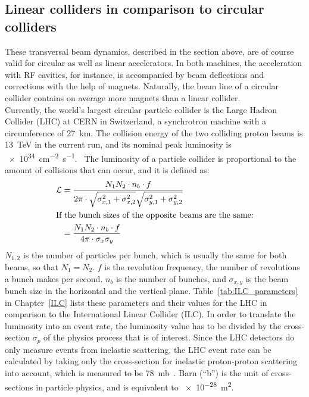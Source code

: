 \subsection{Linear colliders in comparison to circular colliders}
\label{Linear-Circular}
These transversal beam dynamics, described in the section above, are of course valid for circular as well as linear accelerators.
In both machines, the acceleration with RF cavities, for instance, is accompanied by beam deflections and corrections with the help of magnets.
Naturally, the beam line of a circular collider contains on average more magnets than a linear collider.\\
Currently, the world's largest circular particle collider is the Large Hadron Collider (LHC) at CERN in Switzerland, a synchrotron machine with a circumference of \SI{27}{\kilo\meter}.
The collision energy of the two colliding proton beams is \SI{13}{\TeV} in the current run, and its nominal peak luminosity \lumi is \SI{e34}{\centi\meter^{-2}\second^{-1}}.~\cite[p. 3]{LHC_Paper}
The luminosity of a particle collider is proportional to the amount of collisions that can occur, and it is defined as:
\begin{align}
 \mathcal{L}&=\frac{N_1N_2 \cdot n_b \cdot f}{2\pi \cdot \sqrt{\sigma^2_{x,1}+\sigma^2_{x,2}} \sqrt{\sigma^2_{y,1}+\sigma^2_{y,2}}}\\
 \intertext{If the bunch sizes of the opposite beams are the same:}
 &=\frac{N_1N_2 \cdot n_b \cdot f}{4\pi \cdot \sigma_x \sigma_y}
\end{align}
$N_{1,2}$ is the number of particles per bunch, which is usually the same for both beams, so that $N_1=N_2$.
$f$ is the revolution frequency, the number of revolutions a bunch makes per second.
$n_{b}$ is the number of bunches, and $\sigma_{x,y}$ is the beam bunch size in the horizontal and the vertical plane.
Table~\ref{tab:ILC_parameters} in Chapter~\ref{ILC} lists these parameters and their values for the LHC in comparison to the International Linear Collider (ILC).
In order to translate the luminosity into an event rate, the luminosity value has to be divided by the cross-section $\sigma_p$ of the physics process that is of interest.
Since the LHC detectors do only measure events from inelastic scattering, the LHC event rate can be calculated by taking only the cross-section for inelastic proton-proton scattering into account, which is measured to be \SI{78}{\milli\barn}~\cite{inelXSection}. Barn (``b'') is the unit of cross-sections in particle physics, and is equivalent to \SI{e-28}{\meter\squared}.

